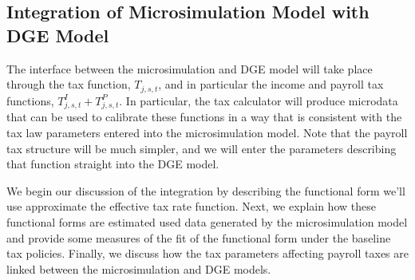 \documentclass[letterpaper,12pt]{article}
\theoremstyle{definition}
\begin{document}
\begin{spacing}{1.5}
%
%

    \FloatBarrier


\section{Integration of Microsimulation Model with DGE Model}\label{SecIntegr}

 The interface between the microsimulation and DGE model will take place through the tax function, $T_{j,s,t}$, and in particular the income and payroll tax functions, $T^I_{j,s,t} + T^P_{j,s,t}$.  In particular, the tax calculator will produce microdata that can be used to calibrate these functions in a way that is consistent with the tax law parameters entered into the microsimulation model.  Note that the payroll tax structure will be much simpler, and we will enter the parameters describing that function straight into the DGE model.  
 
 We begin our discussion of the integration by describing the functional form we'll use approximate the effective tax rate function.  Next, we explain how these functional forms are estimated used data generated by the microsimulation model and provide some measures of the fit of the functional form under the baseline tax policies.  Finally, we discuss how the tax parameters affecting payroll taxes are linked between the microsimulation and DGE models. 



\end{spacing}
\end{document}
